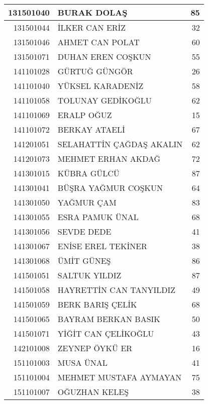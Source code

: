 \documentclass[12pt]{article}
\begin{document}
\begin{multicols}{2}
\begin{longtable}{||r||l||r||}
    \midrule
    131501040 & BURAK DOLAŞ & 85 \\
    \midrule
    131501044 & İLKER CAN ERİZ & 32 \\
    \midrule
    131501046 & AHMET CAN POLAT & 60 \\
    \midrule
    131501071 & DUHAN EREN COŞKUN & 55 \\
    \midrule
    141101028 & GÜRTUĞ GÜNGÖR & 26 \\
    \midrule
    141101040 & YÜKSEL KARADENİZ & \cellcolor[rgb]{ 1,  1,  0} 58 \\
    \midrule
    141101058 & TOLUNAY GEDİKOĞLU & 62 \\
    \midrule
    141101069 & ERALP OĞUZ & 15 \\
    \midrule
    141101072 & BERKAY ATAELİ & 67 \\
    \midrule
    141201051 & SELAHATTİN ÇAĞDAŞ AKALIN & 62 \\
    \midrule
    141201073 & MEHMET ERHAN AKDAĞ & \cellcolor[rgb]{ 1,  1,  0} 72 \\
    \midrule
    141301015 & KÜBRA GÜLCÜ & 87 \\
    \midrule
    141301041 & BÜŞRA YAĞMUR COŞKUN & 64 \\
    \midrule
    141301050 & YAĞMUR ÇAM & 83 \\
    \midrule
    141301055 & ESRA PAMUK ÜNAL & \cellcolor[rgb]{ 1,  1,  0} 68 \\
    \midrule
    141301056 & SEVDE DEDE & 41 \\
    \midrule
    141301067 & ENİSE EREL TEKİNER & 38 \\
    \midrule
    141301068 & ÜMİT GÜNEŞ & 86 \\
    \midrule
    141501051 & SALTUK YILDIZ & 87 \\
    \midrule
    141501058 & HAYRETTİN CAN TANYILDIZ & 49 \\
    \midrule
    141501059 & BERK BARIŞ ÇELİK & 68 \\
    \midrule
    141501065 & BAYRAM BERKAN BASIK & 50 \\
    \midrule
    141501071 & YİĞİT CAN ÇELİKOĞLU & 43 \\
    \midrule
    142101008 & ZEYNEP ÖYKÜ ER & 16 \\
    \midrule
    151101003 & MUSA ÜNAL & \cellcolor[rgb]{ 1,  1,  0} 41 \\
    \midrule
    151101004 & MEHMET MUSTAFA AYMAYAN & \cellcolor[rgb]{ 1,  1,  0} 75 \\
    \midrule
    151101007 & OĞUZHAN KELEŞ & 38 \\

\end{longtable}
\end{multicols}
\end{document}
